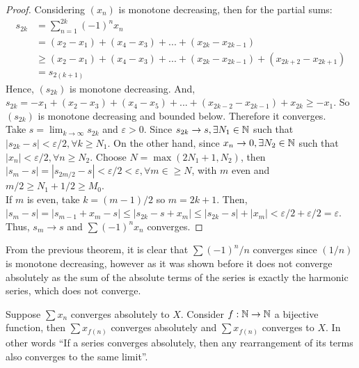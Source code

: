 \begin{proof}
    Considering $(x_n)$ is monotone decreasing, then for the partial sums:
    \begin{align*}
        s_{2k} &= \sum \limits_{n=1}^{2k} (-1)^n x_n \\
        &= (x_2-x_1) + (x_4-x_3) + ... + (x_{2k} - x_{2k-1}) \\
        &\geq (x_2-x_1) + (x_4-x_3) + ... + (x_{2k} - x_{2k-1}) + (x_{2k+2} - x_{2k+1}) \\
        &= s_{2(k+1)}
    \end{align*}
    Hence, $(s_{2k})$ is monotone decreasing. And, $s_{2k} = -x_1 + (x_2-x_3) + (x_4-x_5) + ... + (x_{2k-2}-x_{2k-1}) + x_{2k} \geq -x_1$. So $(s_{2k})$ is monotone decreasing and bounded below. Therefore it converges.  \\
    Take $s = \lim_{k\to \infty} s_{2k}$ and $\varepsilon > 0$. Since $s_{2k} \to s, \exists N_1 \in \mathbb{N}$ such that $|s_{2k} - s| < \varepsilon/2, \forall k \geq N_1$. On the other hand, since $x_n \to 0, \exists N_2 \in \mathbb{N}$ such that $|x_n| < \varepsilon/2, \forall n \geq N_2$. Choose $N = \max(2N_1 + 1, N_2)$, then $|s_m-s| = |s_{2m/2}-s| < \varepsilon/2 < \varepsilon, \forall m \in \geq N$, with $m$ even and $m/2 \geq N_1 + 1/2 \geq M_0$. \\
    If $m$ is even, take $k=(m-1)/2$ so $m = 2k + 1$. Then, $|s_m-s| = |s_{m-1} + x_m - s| \leq |s_{2k} - s + x_m| \leq |s_{2k} - s| + |x_m| < \varepsilon/2 + \varepsilon/2 = \varepsilon$.
    Thus, $s_m \to s$ and $\sum (-1)^n x_n$ converges.
\end{proof}
\vspace{1em}

\begin{remark}
    From the previous theorem, it is clear that $\sum (-1)^n/n$ converges since $(1/n)$ is monotone decreasing, however as it was shown before it does not converge absolutely as the sum of the absolute terms of the series is exactly the harmonic series, which does not converge.
\end{remark}

\begin{theorem}
    Suppose $\sum x_n$ converges absolutely to $X$. Consider $f: \mathbb{N} \to \mathbb{N}$ a bijective function, then $\sum x_{f(n)}$ converges absolutely and $\sum x_{f(n)}$ converges to $X$. In other words ``If a series converges absolutely, then any rearrangement of its terms also converges to the same limit''.
\end{theorem}

